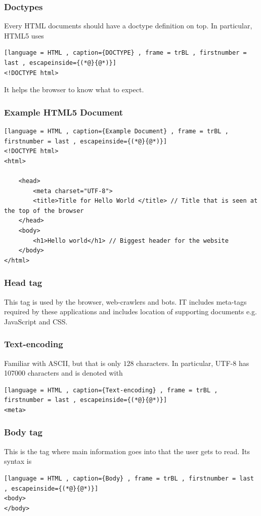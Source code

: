 \documentclass[a4paper]{article}
\theoremstyle{plain}
\theoremstyle{definition}
\theoremstyle{remark}
\begin{document}
\subsubsection{Doctypes}
Every HTML documents should have a doctype definition on top. In particular, HTML5 uses
\begin{lstlisting}[language = HTML , caption={DOCTYPE} , frame = trBL , firstnumber = last , escapeinside={(*@}{@*)}]
<!DOCTYPE html>
\end{lstlisting}
It helps the browser to know what to expect.
\subsubsection{Example HTML5 Document}
\begin{lstlisting}[language = HTML , caption={Example Document} , frame = trBL , firstnumber = last , escapeinside={(*@}{@*)}]
<!DOCTYPE html>
<html>

	<head>
		<meta charset="UTF-8">
		<title>Title for Hello World </title> // Title that is seen at the top of the browser
	</head>
	<body>
		<h1>Hello world</h1> // Biggest header for the website
	</body>
</html>
\end{lstlisting}
\subsubsection{Head tag}
This tag is used by the browser, web-crawlers and bots. IT includes meta-tags required by these applications and includes location of supporting documents e.g. JavaScript and CSS.
\subsubsection{Text-encoding}
Familiar with ASCII, but that is only $128$ characters. In particular, UTF-8 has 107000 characters and is denoted with
\begin{lstlisting}[language = HTML , caption={Text-encoding} , frame = trBL , firstnumber = last , escapeinside={(*@}{@*)}]
<meta>
\end{lstlisting}
\subsubsection{Body tag}
This is the tag where main information goes into that the user gets to read. Its syntax is 
\begin{lstlisting}[language = HTML , caption={Body} , frame = trBL , firstnumber = last , escapeinside={(*@}{@*)}]
<body>
</body>
\end{lstlisting}
\end{document}
